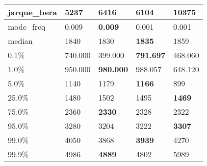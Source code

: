 \begin{table}[H]
\begin{tabular}{|l|m{10em}|m{10em}|m{10em}|m{10em}|}
\hline jarque\_bera & 5237 & 6416 & \bfseries 6104 & \cellcolor[rgb]{0.9, 0.54, 0.52} 10375 \\
\hline mode\_freq & 0.009 & \bfseries 0.009 & \cellcolor[rgb]{0.9, 0.54, 0.52} 0.001 & 0.001 \\
\hline median & 1840 & 1830 & \bfseries 1835 & \cellcolor[rgb]{0.9, 0.54, 0.52} 1859 \\
\hline 0.1\% & 740.000 & \cellcolor[rgb]{0.9, 0.54, 0.52} 399.000 & \bfseries 791.697 & 468.060 \\
\hline 1.0\% & 950.000 & \bfseries 980.000 & 988.057 & \cellcolor[rgb]{0.9, 0.54, 0.52} 648.120 \\
\hline 5.0\% & 1140 & 1179 & \bfseries 1166 & \cellcolor[rgb]{0.9, 0.54, 0.52} 899 \\
\hline 25.0\% & 1480 & \cellcolor[rgb]{0.9, 0.54, 0.52} 1502 & 1495 & \bfseries 1469 \\
\hline 75.0\% & 2360 & \bfseries 2330 & 2328 & \cellcolor[rgb]{0.9, 0.54, 0.52} 2322 \\
\hline 95.0\% & 3280 & \cellcolor[rgb]{0.9, 0.54, 0.52} 3204 & 3222 & \bfseries 3307 \\
\hline 99.0\% & 4050 & 3868 & \bfseries 3939 & \cellcolor[rgb]{0.9, 0.54, 0.52} 4270 \\
\hline 99.9\% & 4986 & \bfseries 4889 & 4802 & \cellcolor[rgb]{0.9, 0.54, 0.52} 5989 \\
\hline
\end{tabular}
\end{table}

